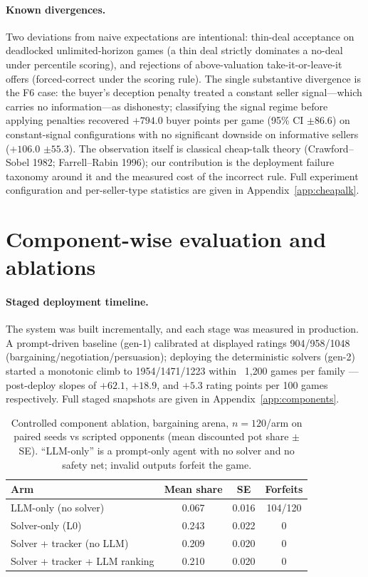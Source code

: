 \documentclass{article}
\begin{document}
\paragraph{Known divergences.} Two deviations from naive expectations are intentional: thin-deal acceptance on deadlocked unlimited-horizon games (a thin deal strictly dominates a no-deal under percentile scoring), and rejections of above-valuation take-it-or-leave-it offers (forced-correct under the scoring rule). The single substantive divergence is the F6 case: the buyer's deception penalty treated a constant seller signal---which carries no information---as dishonesty; classifying the signal regime before applying penalties recovered $+794.0$ buyer points per game (95\% CI $\pm 86.6$) on constant-signal configurations with no significant downside on informative sellers ($+106.0$ $\pm 55.3$). The observation itself is classical cheap-talk theory (Crawford--Sobel 1982; Farrell--Rabin 1996); our contribution is the deployment failure taxonomy around it and the measured cost of the incorrect rule. Full experiment configuration and per-seller-type statistics are given in Appendix~\ref{app:cheapalk}.

\section{Component-wise evaluation and ablations}

\paragraph{Staged deployment timeline.} The system was built incrementally, and each stage was measured in production. A prompt-driven baseline (gen-1) calibrated at displayed ratings 904/958/1048 (bargaining/negotiation/persuasion); deploying the deterministic solvers (gen-2) started a monotonic climb to 1954/1471/1223 within ~1{,}200 games per family --- post-deploy slopes of $+62.1$, $+18.9$, and $+5.3$ rating points per 100 games respectively. Full staged snapshots are given in Appendix~\ref{app:components}.

\begin{table}[t]\centering\small
\caption{Controlled component ablation, bargaining arena, $n=120$/arm on paired seeds vs scripted opponents (mean discounted pot share $\pm$ SE). ``LLM-only'' is a prompt-only agent with no solver and no safety net; invalid outputs forfeit the game.}
\label{tab:components}
\begin{tabular}{lccc}
\toprule
Arm & Mean share & SE & Forfeits \\
\midrule
LLM-only (no solver) & 0.067 & 0.016 & 104/120 \\
Solver-only (L0) & 0.243 & 0.022 & 0 \\
Solver + tracker (no LLM) & 0.209 & 0.020 & 0 \\
Solver + tracker + LLM ranking & 0.210 & 0.020 & 0 \\
\bottomrule
\end{tabular}
\end{table}
\end{document}
